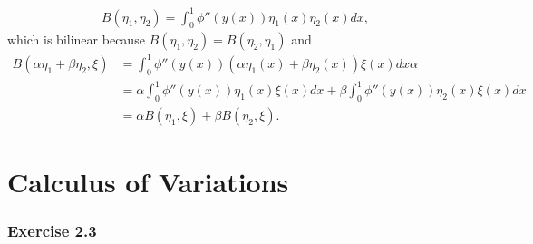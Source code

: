 \documentclass[a4paper]{article}
\begin{document}
\begin{align*}
  B(\eta_{1}, \eta_{2}) = \int_{0}^{1} \phi''(y(x)) \eta_{1}(x) \eta_{2}(x) dx ,
\end{align*}
which is bilinear because $B(\eta_{1}, \eta_{2}) = B(\eta_{2}, \eta_{1})$ and
\begin{align*}
  B(\alpha \eta_{1} + \beta \eta_{2}, \xi) &= \int_{0}^{1} \phi''(y(x)) (\alpha \eta_{1}(x) + \beta \eta_{2}(x)) \xi(x) dx \alpha \\
  &= \alpha \int_{0}^{1} \phi''(y(x)) \eta_{1}(x) \xi(x) dx + \beta \int_{0}^{1} \phi''(y(x)) \eta_{2}(x) \xi(x) dx \\
  &= \alpha B(\eta_{1}, \xi) + \beta B(\eta_{2}, \xi) .
\end{align*}


\section{Calculus of Variations}

\subsubsection*{Exercise 2.3}
\end{document}
